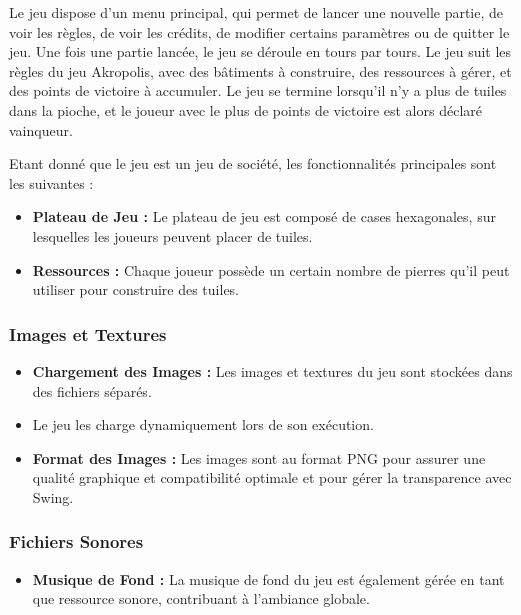 \documentclass{article}
\begin{document}
    Le jeu dispose d'un menu principal, qui permet de lancer une nouvelle partie, de voir les règles, de voir les crédits, de modifier certains paramètres ou de quitter le jeu.
    Une fois une partie lancée, le jeu se déroule en tours par tours.
    Le jeu suit les règles du jeu Akropolis, avec des bâtiments à construire, des ressources à gérer, et des points de victoire à accumuler.
    Le jeu se termine lorsqu'il n'y a plus de tuiles dans la pioche, et le joueur avec le plus de points de victoire est alors déclaré vainqueur.

    Etant donné que le jeu est un jeu de société, les fonctionnalités principales sont les suivantes :
    \begin{itemize}
        \item \textbf{Plateau de Jeu :} Le plateau de jeu est composé de cases hexagonales, sur lesquelles les joueurs peuvent placer de tuiles.
        \item \textbf{Ressources :} Chaque joueur possède un certain nombre de pierres qu'il peut utiliser pour construire des tuiles. \end{itemize}

    \subsubsection*{Images et Textures}

    \begin{itemize}
        \item \textbf{Chargement des Images :} Les images et textures du jeu sont stockées dans des fichiers séparés.

        \item Le jeu les charge dynamiquement lors de son exécution.

        \item \textbf{Format des Images :} Les images sont au format PNG pour assurer une qualité graphique et compatibilité optimale et pour gérer la transparence avec Swing. 
    \end{itemize}

    \subsubsection*{Fichiers Sonores}

    \begin{itemize}
        \item \textbf{Musique de Fond :} La musique de fond du jeu est également gérée en tant que ressource sonore, contribuant à l'ambiance globale.
    \end{itemize}
\end{document}
